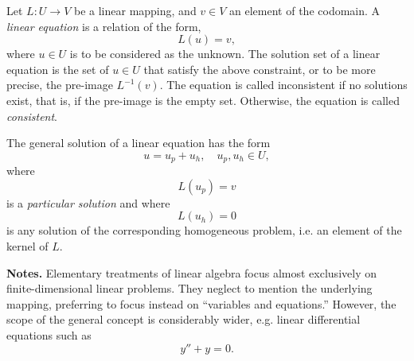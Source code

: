 \documentclass[12pt]{article}
\begin{document}
Let $L:U\rightarrow V$ be a linear mapping, and $v\in V$ an element of
the codomain.  A {\em linear equation}  is
a relation of the form,
$$L(u)=v,$$
where $u\in U$ is to be considered as the unknown.  The
solution set of a linear equation is the set of $u\in U$ that satisfy the
above constraint, or to be more precise, the pre-image $L^{-1}(v)$.  The equation is
called inconsistent if no solutions exist, that is, if the pre-image is
the empty set. Otherwise, the equation is called \emph{consistent}.

The general solution of
a linear equation has the form
$$u=u_p + u_h,\quad u_p,u_h\in U,$$
where 
$$L(u_p)=v$$
is a \emph{particular solution} and where
$$L(u_h)=0$$
is any  solution of the corresponding homogeneous problem, i.e. an
element of the kernel of $L$.

{\bf Notes.} Elementary treatments of linear algebra focus almost
exclusively on finite-dimensional linear problems. They neglect to
mention the underlying mapping, preferring to focus instead on
``variables and equations.'' However, the scope of the general concept
is considerably wider, e.g.  linear differential equations such as
$$y''+y = 0.$$
\end{document}
